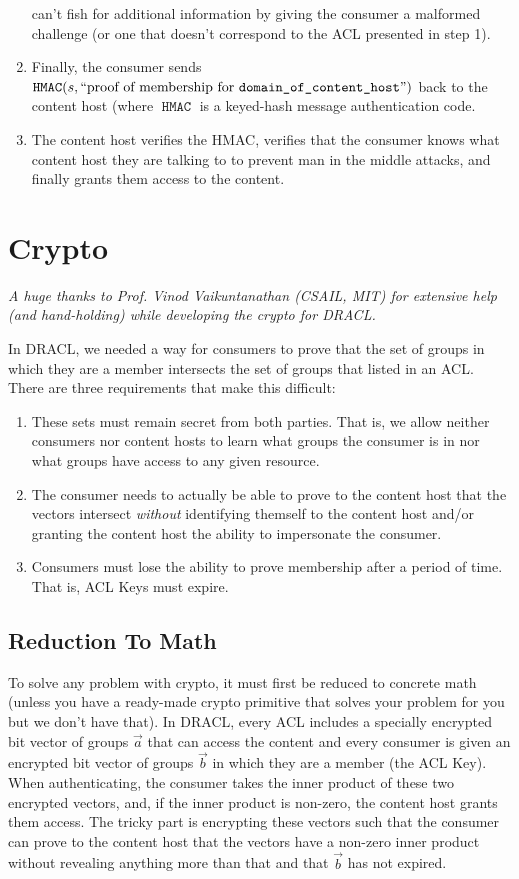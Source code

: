 \documentclass[pdftex,12pt,a4papaer,twoside,notitlepage]{report}
\DeclareMathOperator{\hmac}{\mathtt{HMAC}}
\begin{document}
\begin{enumerate}
    can't fish for additional information by giving the consumer a malformed
    challenge (or one that doesn't correspond to the ACL presented in step 1).
  \item Finally, the consumer sends $\hmac(s, \text{``proof of membership for
      \texttt{domain\_of\_content\_host}''})$ back to the content host (where
    $\hmac$ is a keyed-hash message authentication code.
  \item The content host verifies the HMAC, verifies that the consumer knows
    what content host they are talking to to prevent man in the middle attacks,
    and finally grants them access to the content.
\end{enumerate}


\chapter{Crypto}
\label{chap:crypto}

\textit{A huge thanks to Prof. Vinod Vaikuntanathan (CSAIL, MIT) for extensive
  help (and hand-holding) while developing the crypto for DRACL.}

In DRACL, we needed a way for consumers to prove that the set of groups in which
they are a member intersects the set of groups that listed in an ACL. There are
three requirements that make this difficult:

\begin{enumerate}
\item These sets must remain secret from both parties. That is, we allow neither
  consumers nor content hosts to learn what groups the consumer is in nor what
  groups have access to any given resource.
\item The consumer needs to actually be able to prove to the content host that
  the vectors intersect \emph{without} identifying themself to the content host
  and/or granting the content host the ability to impersonate the consumer.
\item Consumers must lose the ability to prove membership after a period of
  time. That is, ACL Keys must expire.
\end{enumerate}

\section{Reduction To Math}
\label{sec:reduce-to-math}

To solve any problem with crypto, it must first be reduced to concrete math
(unless you have a ready-made crypto primitive that solves your problem for you
but we don't have that). In DRACL, every ACL includes a specially encrypted bit
vector of groups $\vec{a}$ that can access the content and every consumer is
given an encrypted bit vector of groups $\vec{b}$ in which they are a member
(the ACL Key). When authenticating, the consumer takes the inner product of
these two encrypted vectors, and, if the inner product is non-zero, the content
host grants them access. The tricky part is encrypting these vectors such that
the consumer can prove to the content host that the vectors have a non-zero
inner product without revealing anything more than that and that $\vec{b}$ has
not expired.
\end{document}
